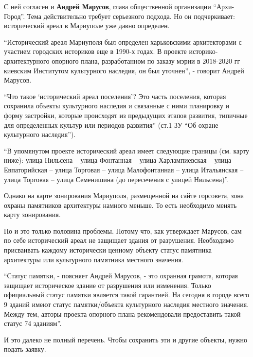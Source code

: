 С ней согласен и \textbf{Андрей Марусов}, глава общественной организации \enquote{Архи-Город}.
Тема действительно требует серьезного подхода. Но он подчеркивает: исторический
ареал в Мариуполе  уже давно определен.

\enquote{Исторический ареал Мариуполя был определен харьковскими архитекторами с
участием городских историков еще в 1990-х годах. В проекте
историко-архитектурного опорного плана, разработанном по заказу мэрии в
2018-2020 гг киевским Институтом культурного наследия, он был уточнен}, -
говорит Андрей Марусов.

\enquote{Что такое \enquote{исторический ареал поселения}?  Это часть поселения, которая
сохранила объекты культурного наследия и связанные с ними планировку и форму
застройки, которые происходят из предыдущих этапов развития, типичные для
определенных культур или периодов развития} (ст.1 ЗУ \enquote{Об охране культурного
наследия}). 

\enquote{В упомянутом проекте исторический ареал имеет следующие границы (см. карту
ниже): улица Нильсена – улица Фонтанная – улица Харлампиевская – улица
Евпаторийская – улица Торговая – улица Малофонтанная – улица Итальянская –
улица Торговая – улица Семенишина (до пересечения с улицей Нильсена)}.


Однако на карте зонирования Мариуполя, размещенной на сайте горсовета, зона
охраны памятников архитектуры намного меньше. То есть необходимо менять карту
зонирования.


Но и это только половина проблемы. Потому что, как утверждает Марусов, сам по
себе исторический ареал не защищает здания от разрушения. Необходимо
присваивать каждому исторически ценному объекту статус памятника архитектуры
или культурного памятника местного значения.

\enquote{Статус памятки,  - поясняет Андрей Марусов, - это охранная грамота, которая
защищает историческое здание от разрушения или изменения. Только официальный
статус памятки является такой гарантией. На сегодня в городе всего 9 зданий
имеют статус памятки/объекта культурного наследия местного значения. Между тем,
авторы проекта опорного плана рекомендовали предоставить такой статус 74
зданиям}. 

И это далеко не полный перечень. Чтобы сохранить эти и другие объекты, нужно подать заявку. 

